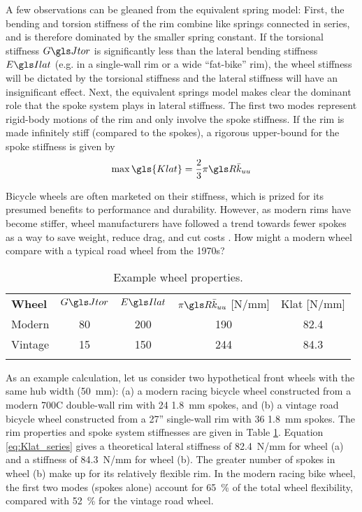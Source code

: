 \documentclass[\rootdir/thesis.tex]{subfiles}
\begin{document}
A few observations can be gleaned from the equivalent spring model: First, the bending and torsion stiffness of the rim combine like springs connected in series, and is therefore dominated by the smaller spring constant. If the torsional stiffness $\GJ$ is significantly less than the lateral bending stiffness $\EIl$ (e.g. in a single-wall rim or a wide ``fat-bike'' rim), the wheel stiffness will be dictated by the torsional stiffness and the lateral stiffness will have an insignificant effect. Next, the equivalent springs model makes clear the dominant role that the spoke system plays in lateral stiffness. The first two modes represent rigid-body motions of the rim and only involve the spoke stiffness. If the rim is made infinitely stiff (compared to the spokes), a rigorous upper-bound for the spoke stiffness is given by
\begin{equation}
\label{eq:Klat_stiff_rim}
\max{\gls{Klat}} = \frac{2}{3} \pi \R \kuu
\end{equation}

Bicycle wheels are often marketed on their stiffness, which is prized for its presumed benefits to performance and durability. However, as modern rims have become stiffer, wheel manufacturers have followed a trend towards fewer spokes as a way to save weight, reduce drag, and cut costs \cite{Brown2011}. How might a modern wheel compare with a typical road wheel from the 1970s?

\begin{table}[h]
\caption{Example wheel properties.\label{tab:wheels}}
\begin{tabular}{@{}lcccc}
\hline\noalign{\smallskip}
\bf{Wheel} & $\GJ$ & $\EIl$ & $\pi\R\kuu$ [N/mm] & \gls{Klat} [N/mm]\\
\noalign{\smallskip}\hline\noalign{\smallskip}
Modern  & 80 & 200 & 190 & 82.4\\
Vintage & 15 & 150 & 244 & 84.3\\
\noalign{\smallskip}\hline
\end{tabular}
\end{table}

As an example calculation, let us consider two hypothetical front wheels with the same hub width (\SI{50}{mm}): (a) a modern racing bicycle wheel constructed from a modern 700C double-wall rim with 24 \SI{1.8}{mm} spokes, and (b) a vintage road bicycle wheel constructed from a 27'' single-wall rim with 36 \SI{1.8}{mm} spokes. The rim properties and spoke system stiffnesses are given in Table \ref{tab:wheels}. Equation \eqref{eq:Klat_series} gives a theoretical lateral stiffness of \SI{82.4}{N/mm} for wheel (a) and a stiffness of \SI{84.3}{N/mm} for wheel (b). The greater number of spokes in wheel (b) make up for its relatively flexible rim. In the modern racing bike wheel, the first two modes (spokes alone) account for \SI{65}{\percent} of the total wheel flexibility, compared with \SI{52}{\percent} for the vintage road wheel.
\end{document}
